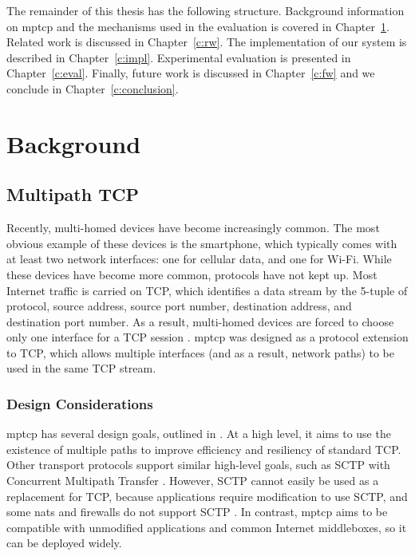 \documentclass{cwru}
\begin{document}
The remainder of this thesis has the following structure. Background information
on \ac{mptcp} and the mechanisms used in the evaluation is covered in
Chapter~\ref{c:bg}. Related work is discussed in Chapter~\ref{c:rw}. The
implementation of our system is described in Chapter~\ref{c:impl}. Experimental
evaluation is presented in Chapter~\ref{c:eval}. Finally, future work is
discussed in Chapter~\ref{c:fw} and we conclude in Chapter~\ref{c:conclusion}.

\chapter{Background}
\label{c:bg}

\section{Multipath TCP}

Recently, multi-homed devices have become increasingly common. The most obvious
example of these devices is the smartphone, which typically comes with at least
two network interfaces: one for cellular data, and one for Wi-Fi. While these
devices have become more common, protocols have not kept up. Most Internet
traffic is carried on TCP, which identifies a data stream by the 5-tuple of
protocol, source address, source port number, destination address, and
destination port number. As a result, multi-homed devices are forced to choose
only one interface for a TCP session \cite{raiciu2012hard}. \ac{mptcp} was
designed as a protocol extension to TCP, which allows multiple interfaces (and
as a result, network paths) to be used in the same TCP stream.

\subsection{Design Considerations}
\label{sec:mptcp-design}

\ac{mptcp} has several design goals, outlined in \cite{rfc6182}. At a high
level, it aims to use the existence of multiple paths to improve efficiency and
resiliency of standard TCP. Other transport protocols support similar high-level
goals, such as SCTP with Concurrent Multipath Transfer
\cite{iyengar2006concurrent}. However, SCTP cannot easily be used as a
replacement for TCP, because applications require modification to use SCTP, and
some \acp{nat} and firewalls do not support SCTP \cite{barre2011multipath}. In
contrast, \ac{mptcp} aims to be compatible with unmodified applications and
common Internet middleboxes, so it can be deployed widely.
\end{document}
